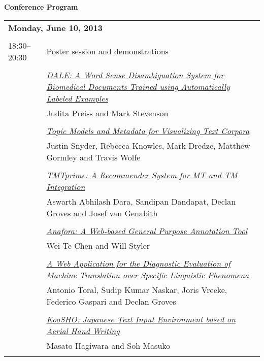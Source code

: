 \setlength{\parindent}{0in}
\setlength{\parskip}{2ex}
\renewcommand{\baselinestretch}{0.87}

\begin{center}
{\Large \bf
  Conference Program
}
\end{center}
\vspace{3mm}
\begin{tabular}{p{20mm}p{128mm}}
\multicolumn{2}{l}{\bf Monday, June 10, 2013} \\
\\
18:30--20:30 & Poster session and demonstrations \\
\\
 & \hyperlink{page.1}{\em DALE: A Word Sense Disambiguation System for Biomedical Documents Trained using Automatically Labeled Examples}\\
         & Judita Preiss and Mark Stevenson \\
\\

 & \hyperlink{page.5}{\em Topic Models and Metadata for Visualizing Text Corpora}\\
         & Justin Snyder, Rebecca Knowles, Mark Dredze, Matthew Gormley and Travis Wolfe \\
\\

 & \hyperlink{page.10}{\em TMTprime: A Recommender System for MT and TM Integration}\\
         & Aswarth Abhilash Dara, Sandipan Dandapat, Declan Groves and Josef van Genabith \\
\\

 & \hyperlink{page.14}{\em Anafora: A Web-based General Purpose Annotation Tool}\\
         & Wei-Te Chen and Will Styler \\
\\

 & \hyperlink{page.20}{\em A Web Application for the Diagnostic Evaluation of Machine Translation over Specific Linguistic Phenomena}\\
         & Antonio Toral, Sudip Kumar Naskar, Joris Vreeke, Federico Gaspari and Declan Groves \\
\\

 & \hyperlink{page.24}{\em KooSHO: Japanese Text Input Environment based on Aerial Hand Writing}\\
         & Masato Hagiwara and Soh Masuko \\
\\


\end{tabular}
